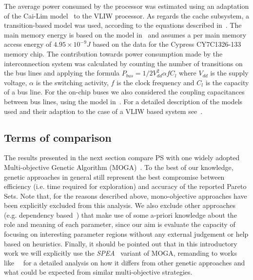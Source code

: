 The average power consumed by the processor was estimated using an
adaptation of the Cai-Lim model~\cite{cai_micro99} to the VLIW
processor. As regards the cache subsystem, a transition-based model
was used, according to the equations described
in~\cite{kamble_islped97}.  The main memory energy is based on the
model in~\cite{shiue_dac99} and assumes a per main memory access
energy of $4.95 \times 10^{-9} J$ based on the data for the Cypress
CY7C1326-133 memory chip.  The contribution towards power consumption
made by the interconnection system was calculated by counting the
number of transitions on the bus lines and applying the formula
$P_{bus} = 1/2 V_{dd}^2 \alpha f C_l$ where $V_{dd}$ is the supply
voltage, $\alpha$ is the switching activity, $f$ is the clock
frequency and $C_l$ is the capacity of a bus line. For the on-chip
buses we also considered the coupling capacitances between bus lines,
using the model in~\cite{lekatsas_dac01}. For a detailed description
of the models used and their adaption to the case of a VLIW based
system see~\cite{palpatti_estimedia03}.


\subsection{Terms of comparison}

The results presented in the next section compare PS with one widely
adopted Multi-objective Genetic Algorithm
(MOGA)~\cite{knowles_techrep06}. To the best of our knowledge, genetic
approaches in general still represent the best compromise between
efficiency (i.e. time required for exploration) and accuracy of the
reported Pareto Sets.  Note that, for the reasons described above,
mono-objective approaches have been explicitly excluded from this
analysis.  We also exclude other approaches (e.g.  dependency
based~\cite{givargis_tvlsi02}) that make use of some a-priori
knowledge about the role and meaning of each parameter, since our aim
is evaluate the capacity of focusing on interesting parameter regions
without any external judgement or help based on heuristics.  Finally,
it should be pointed out that in this introductory work we will
explicitly use the \emph{SPEA}~\cite{zitzler_eurogen01} variant of
MOGA, remanding to works like~\cite{zitzler_ec00}~\cite{zitzler_tec03}
for a detailed analysis on how it differs from other genetic approaches
and what could be expected from similar multi-objective strategies.




